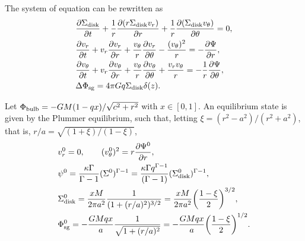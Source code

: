\documentclass[11pt]{article}
\newcommand{\vr}{v_{r}}
\newcommand{\vt}{v_{\theta}}
\newcommand{\Sigmad}{\Sigma_{\rm{disk}}}
\newcommand{\Phib}{\Phi_{\rm{bulb}}}
\newcommand{\Phisg}{\Phi_{\rm{sg}}}
\begin{document}
The system of equation can be rewritten as 
\begin{align}
&\frac{\partial \Sigmad}{\partial t} + \frac{1}{r} \frac{\partial(r\Sigmad \vr)}{\partial r} + \frac{1}{r} \frac{\partial(\Sigmad \vt)}{\partial \theta} = 0 ,\\
&\frac{\partial \vr}{\partial t} + \vr \frac{\partial \vr}{\partial r} + \frac{\vt}{r} \frac{\partial \vr}{\partial \theta} - \frac{(\vt)^2}{r} = -\frac{\partial \Psi}{\partial r} ,\\
&\frac{\partial \vt}{\partial t} + \vr \frac{\partial \vt}{\partial r} + \frac{\vt}{r} \frac{\partial \vt}{\partial \theta} + \frac{\vr\vt}{r} = -\frac{1}{r}\frac{\partial \Psi}{\partial \theta} ,\\
& \Delta \Phisg = 4\pi G q\Sigmad \delta (z).
\end{align}

 Let $\Phib = - G M (1-q x)/\sqrt{c^2+r^2}$ with $x\in [0,1]$. An equilibrium state is given by the Plummer equilibrium, such that,  letting $\xi = (r^2-a^2)/(r^2+a^2) $, that is, $r/a=\sqrt{(1+\xi)/(1-\xi)}$,
\begin{align*}
&\vr^0 = 0,\quad \quad (\vt^0)^2 = r \frac{\partial \Psi^0}{\partial r}, \\
& \psi^0 = \frac{\kappa \Gamma}{\Gamma-1} (\Sigma^0)^{\Gamma-1} = \frac{\kappa \Gamma q^{\Gamma-1}}{(\Gamma-1)} (\Sigmad^0)^{\Gamma-1},\\
& \Sigmad^0 = \frac{xM}{2\pi a^2} \frac{1}{(1+(r/a)^2)^{3/2}} =\frac{xM}{2\pi a^2}   \bigg(\frac{1-\xi}{2}\bigg)^{3/2},\\
& \Phisg^0 = -\frac{G Mqx}{a } \frac{1}{\sqrt{1+(r/a)^2}} = -\frac{G M qx}{a } \bigg(\frac{1-\xi}{2}\bigg)^{1/2} .
\end{align*}
\end{document}
